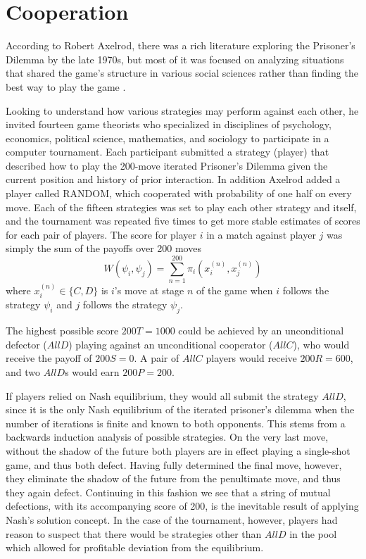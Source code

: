 \chapter{Cooperation}

According to Robert Axelrod, there was a rich literature exploring the Prisoner's Dilemma by the late 1970s, but most of it was focused on analyzing situations that shared the game's structure in various social sciences rather than finding the best way to play the game \cite[p.28]{axelrod1984evolution}.

Looking to understand how various strategies may perform against each other, he invited fourteen game theorists who specialized in disciplines of psychology, economics, political science, mathematics, and sociology to participate in a computer tournament. Each participant submitted a strategy (player) that described how to play the 200-move iterated Prisoner's Dilemma given the current position and history of prior interaction. In addition Axelrod added a player called RANDOM, which cooperated with probability of one half on every move. Each of the fifteen strategies was set to play each other strategy and itself, and the tournament was repeated five times to get more stable estimates of scores for each pair of players. The score for player $i$ in a match against player $j$ was simply the sum of the payoffs over 200 moves
\[
W(\psi_i, \psi_j) = \sum_{n=1}^{200} \pi_i(x_i^{(n)}, x_j^{(n)}) 
\]
where $x_i^{(n)} \in \{C, D\}$ is $i$'s move at stage $n$ of the game when $i$ follows the strategy $\psi_i$ and $j$ follows the strategy $\psi_j$.

The highest possible score $200 T = 1000$ could be achieved by an unconditional defector ($AllD$) playing against an unconditional cooperator ($AllC$), who would receive the payoff of $200 S = 0$. A pair of $AllC$ players would receive $200 R = 600$, and two $AllD$s would earn $200 P = 200$.

If players relied on Nash equilibrium, they would all submit the strategy $AllD$, since it is the only Nash equilibrium of the iterated prisoner's dilemma when the number of iterations is finite and known to both opponents. This stems from a backwards induction analysis of possible strategies. On the very last move, without the shadow of the future both players are in effect playing a single-shot game, and thus both defect. Having fully determined the final move, however, they eliminate the shadow of the future from the penultimate move, and thus they again defect. Continuing in this fashion we see that a string of mutual defections, with its accompanying score of 200, is the inevitable result of applying Nash's solution concept. In the case of the tournament, however, players had reason to suspect that there would be strategies other than $AllD$ in the pool which allowed for profitable deviation from the equilibrium.

